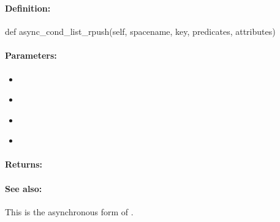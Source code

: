 \pagebreak
\subsubsection{}
\label{api:python:async_cond_list_rpush}


\paragraph{Definition:}
\begin{pythoncode}
def async_cond_list_rpush(self, spacename, key, predicates, attributes)
\end{pythoncode}

\paragraph{Parameters:}
\begin{itemize}[noitemsep]
\item {}\\

\item {}\\

\item {}\\

\item {}\\

\end{itemize}

\paragraph{Returns:}


\paragraph{See also:}  This is the asynchronous form of .

\pagebreak
\subsubsection{}
\label{api:python:group_list_rpush}



